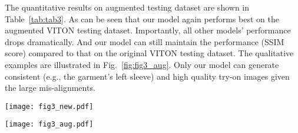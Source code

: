 \documentclass[10pt,twocolumn,letterpaper]{article}
\begin{document}
The quantitative results on augmented testing dataset are shown in Table~\ref{tab:tab3}. As can be seen that our model again performs best on the augmented VITON testing dataset. Importantly, all other models' performance drops dramatically. And our model can still maintain the performance (SSIM score) compared to that on the original VITON testing dataset. The qualitative examples are illustrated in Fig.~\ref{fig:fig3_aug}. Only our model can generate consistent (e.g., the garment's left sleeve) and high quality try-on images given the large mis-alignments.
\vspace{-0.4cm}
\begin{figure*}[t!]
    \centering
    \texttt{[image: fig3\_new.pdf]}
    \caption{Qualitative results from different models (CP-VTON++ \cite{minar2020cp}, ACGPN \cite{yang2020towards}, PF-AFN \cite{ge2021disentangled} and ours) on VITON testing dataset.}
    \vspace{-0.0cm}
    \label{fig:fig3}
\end{figure*}

\begin{figure*}[t!]
    \centering
    \texttt{[image: fig3\_aug.pdf]}
    \caption{Illustrating different VTON models' robustness to the randomly positioned person image. First row uses original person image as input. And second row uses vertically shifted person image as input. ACGPN \cite{yang2020towards}, Cloth-flow \cite{han2019clothflow}, PF-AFN \cite{ge2021parser}.}
    \vspace{-0.4cm}
    \label{fig:fig3_aug}
\end{figure*}
\end{document}
